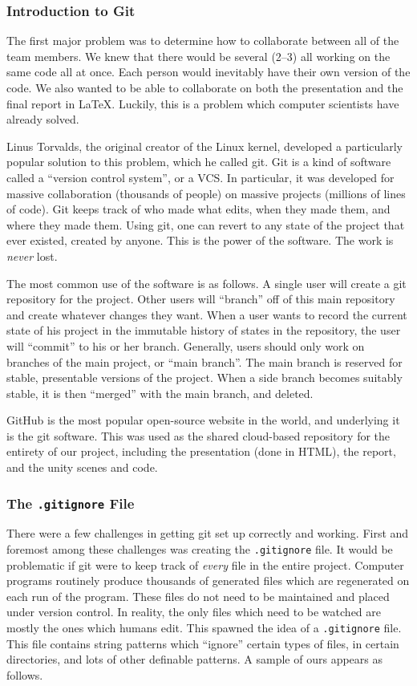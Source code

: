 \documentclass[12pt]{article}
\begin{document}
\subsubsection{Introduction to Git}
The first major problem was to determine how to collaborate between all of the team members. We knew that there would be several (2--3) all working on the same code all at once. Each person would inevitably have their own version of the code. We also wanted to be able to collaborate on both the presentation and the final report in \LaTeX{}. Luckily, this is a problem which computer scientists have already solved.

Linus Torvalds, the original creator of the Linux kernel, developed a particularly popular solution to this problem, which he called git. Git is a kind of software called a \enquote{version control system}, or a VCS. In particular, it was developed for massive collaboration (thousands of people) on massive projects (millions of lines of code). Git keeps track of who made what edits, when they made them, and where they made them. Using git, one can revert to any state of the project that ever existed, created by anyone. This is the power of the software. The work is \emph{never} lost. 

The most common use of the software is as follows. A single user will create a git repository for the project. Other users will \enquote{branch} off of this main repository and create whatever changes they want. When a user wants to record the current state of his project in the immutable history of states in the repository, the user will \enquote{commit} to his or her branch. Generally, users should only work on branches of the main project, or \enquote{main branch}. The main branch is reserved for stable, presentable versions of the project. When a side branch becomes suitably stable, it is then \enquote{merged} with the main branch, and deleted.

GitHub is the most popular open-source website in the world, and underlying it is the git software. This was used as the shared cloud-based repository for the entirety of our project, including the presentation (done in HTML), the report, and the unity scenes and code.

\subsubsection{The \texttt{.gitignore} File}
There were a few challenges in getting git set up correctly and working. First and foremost among these challenges was creating the \texttt{.gitignore} file. It would be problematic if git were to keep track of \emph{every} file in the entire project. Computer programs routinely produce thousands of generated files which are regenerated on each run of the program. These files do not need to be maintained and placed under version control. In reality, the only files which need to be watched are mostly the ones which humans edit. This spawned the idea of a \texttt{.gitignore} file. This file contains string patterns which \enquote{ignore} certain types of files, in certain directories, and lots of other definable patterns. A sample of ours appears as follows.
\end{document}
